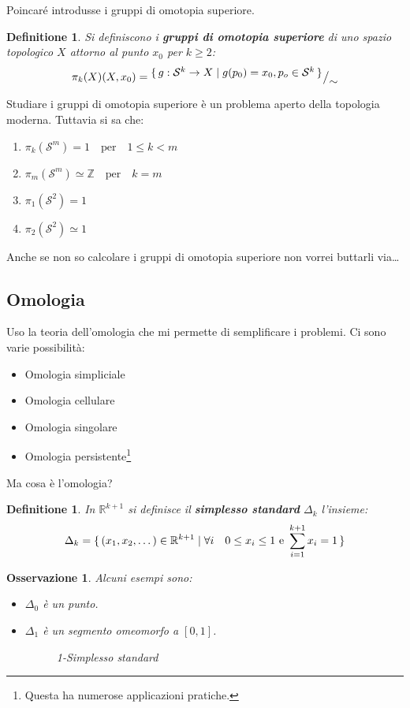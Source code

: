 \documentclass{article}
\newtheorem{osservation}[theorem]{Osservazione}
\newtheorem{definition}[theorem]{Definitione}
\newcommand{\Z}{\mathbb{Z}}
\newcommand{\RN}[1][]{\mathbb{R}^#1}
\newcommand{\Sph}[1][]{\mathcal{S}^#1}
\newcommand*\quot[2]{{^{\textstyle #1}\big/_{\textstyle #2}}}
\begin{document}
Poincaré introdusse i gruppi di omotopia superiore.

\begin{definition}
  Si definiscono i \textbf{gruppi di omotopia superiore} di uno spazio topologico $ X $
  attorno al punto $ x_0 $ per $ k \geq 2 $:
  \[
    \pi_k(X) (X, x_0) = \quot{\set{ g: \Sph{k} \to X | g(p_0) = x_0, p_o \in \Sph{k}}}{\sim}
  \]
\end{definition}
Studiare i gruppi di omotopia superiore è un problema aperto della topologia moderna.
Tuttavia si sa che:
\begin{enumerate}
\item $ \pi_k(\Sph{m}) = 1 \quad \text{per} \quad 1 \leq k < m $
\item $ \pi_m(\Sph{m}) \simeq \Z \quad \text{per} \quad k = m $
\item $ \pi_1(\Sph{2}) = 1 $
\item $ \pi_2(\Sph{2}) \simeq 1 $
\end{enumerate}

Anche se non so calcolare i gruppi di omotopia superiore non vorrei buttarli via\dots

\subsection{Omologia}

Uso la teoria dell'omologia che mi permette di semplificare i problemi.
Ci sono varie possibilità:
\begin{itemize}
  \item Omologia simpliciale
  \item Omologia cellulare
  \item Omologia singolare
  \item Omologia persistente\footnote{Questa ha numerose applicazioni pratiche.}
\end{itemize}
Ma cosa è l'omologia?

\begin{definition}
  In $ \RN{k+1} $ si definisce il \textbf{simplesso standard} $ \Delta_k $ l'insieme:
  \[
    \Delta_k = \set{(x_1,x_2,\dots) \in \RN{k+1} | \forall i \quad 0 \leq x_i \leq 1 \text{ e } \sum_{i=1}^{k+1}x_i = 1}
  \]
\end{definition}

\begin{osservation} Alcuni esempi sono:
  \begin{itemize}
  \item $ \Delta_0 $ è un punto.
  \item $ \Delta_1 $ è un segmento omeomorfo a $ [0,1] $.
    \begin{figure}[htbp]
      \centering
      \caption{1-Simplesso standard}
      \label{fig:lez1:1_standard_simplex}
    \end{figure}
  \end{itemize}
\end{osservation}
\end{document}
